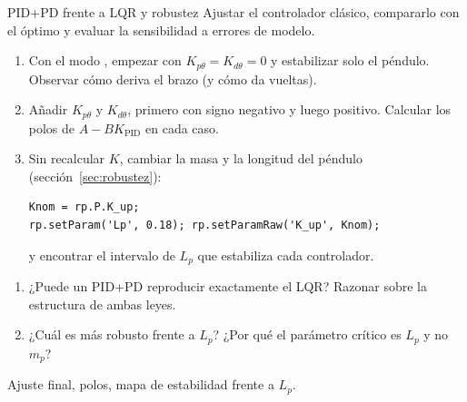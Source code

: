 \label{pr:pid}
\begin{practica}{PID+PD frente a LQR y robustez}
\objetivos Ajustar el controlador clásico, compararlo con el óptimo y evaluar la sensibilidad a errores de modelo.
\procedimiento
\begin{enumerate}
  \item Con el modo , empezar con $K_{p\theta}=K_{d\theta}=0$ y estabilizar solo el péndulo. Observar cómo deriva el brazo (y cómo da vueltas).
  \item Añadir $K_{p\theta}$ y $K_{d\theta}$, primero con signo negativo y luego positivo. Calcular los polos de $A-BK_{\text{PID}}$ en cada caso.
  \item Sin recalcular $K$, cambiar la masa y la longitud del péndulo (sección~\ref{sec:robustez}):
\begin{lstlisting}
Knom = rp.P.K_up;
rp.setParam('Lp', 0.18); rp.setParamRaw('K_up', Knom);
\end{lstlisting}
  y encontrar el intervalo de $L_p$ que estabiliza cada controlador.
\end{enumerate}
\preguntas
\begin{enumerate}
  \item ¿Puede un PID+PD reproducir exactamente el LQR? Razonar sobre la estructura de ambas leyes.
  \item ¿Cuál es más robusto frente a $L_p$? ¿Por qué el parámetro crítico es $L_p$ y no $m_p$?
\end{enumerate}
\entregables Ajuste final, polos, mapa de estabilidad frente a $L_p$.
\end{practica}

